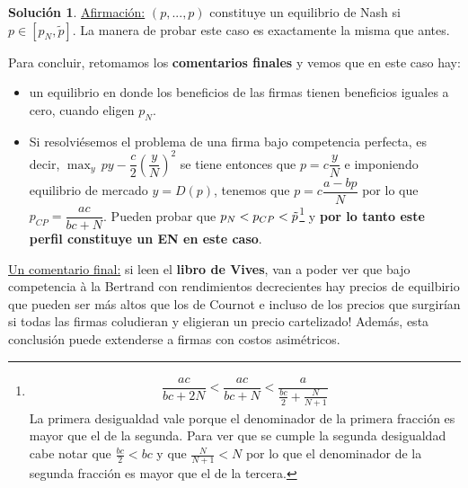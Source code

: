 \documentclass[a4paper, 11pt]{article}
\theoremstyle{definition}
\newtheorem{solucion}{Soluci\'on}
\newcommand{\p}[1]{\left(#1\right)}
\begin{document}
\begin{solucion}
\underline{Afirmación:} $(p,...,p)$ constituye un equilibrio de Nash si $p\in [p_N, \widetilde{p}]$. La manera de probar este caso es exactamente la misma que antes.

Para concluir, retomamos los \textbf{comentarios finales} y vemos que en este caso hay:
\begin{itemize}
    \item un equilibrio en donde los beneficios de las firmas tienen beneficios iguales a cero, cuando eligen $p_N$.
    \item Si resolviésemos el problema de una firma bajo competencia perfecta, es decir, $\displaystyle\max_{y}\,py-\dfrac{c}{2}\p{\dfrac{y}{N}}^2$ se tiene entonces que $p=c\dfrac{y}{N}$ e imponiendo equilibrio de mercado $y=D(p)$, tenemos que $p=c\dfrac{a-bp}{N}$ por lo que $p_{CP}=\dfrac{ac}{bc+N}$. Pueden probar que $p_N<p_{CP}<\Tilde{p}$\footnote{\begin{align*}
        \dfrac{ac}{bc+2N}<\dfrac{ac}{bc+N}<\dfrac{a}{\frac{bc}{2}+\frac{N}{N+1}}
    \end{align*}
    \noindent La primera desigualdad vale porque el denominador de la primera fracción es mayor que el de la segunda. Para ver que se cumple la segunda desigualdad cabe notar que $\frac{bc}{2}<bc$ y que $\frac{N}{N+1}<N$ por lo que el denominador de la segunda fracción es mayor que el de la tercera.} y \textbf{por lo tanto este perfil constituye un EN en este caso}. 
\end{itemize}

\underline{Un comentario final:} si leen el \textbf{libro de Vives}, van a poder ver que bajo competencia à la Bertrand con rendimientos decrecientes hay precios de equilbirio que pueden ser más altos que los de Cournot e incluso de los precios que surgirían si todas las firmas coludieran y eligieran un precio cartelizado! Además, esta conclusión puede extenderse a firmas con costos asimétricos.

\end{solucion}
\end{document}
